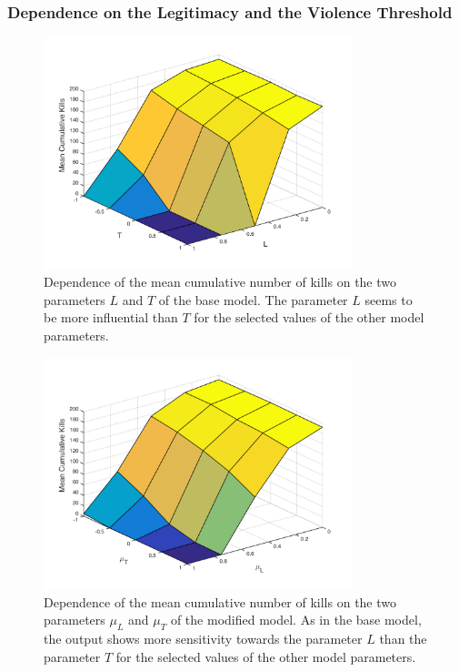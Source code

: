 \documentclass[11pt]{article}
\begin{document}
\subsubsection{Dependence on the Legitimacy and the Violence Threshold}
\begin{figure}[!htbp]
	\centering
		\includegraphics[width=0.80\textwidth]{../../code/base_model/L_T_dep_mean.png}
	\caption{Dependence of the mean cumulative number of kills on the two parameters $L$ and $T$ of the base model. The parameter $L$ seems to be more influential than $T$ for the selected values of the other model parameters.}
	\label{fig:L_T_dep_base}
\end{figure}
\begin{figure}[!htbp]
	\centering
		\includegraphics[width=0.80\textwidth]{../../code/modified_model/L_T_mean_dep_mean.png}
	\caption{Dependence of the mean cumulative number of kills on the two parameters $\mu_L$ and $\mu_T$ of the modified model. As in the base model, the output shows more sensitivity towards the parameter $L$ than the parameter $T$ for the selected values of the other model parameters.}
	\label{fig:L_T_dep_mod}
\end{figure}
\end{document}
